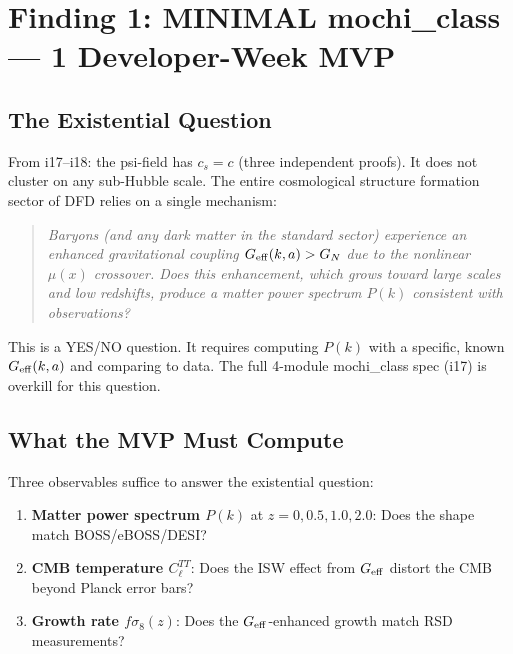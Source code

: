 \documentclass[11pt]{article}
\theoremstyle{definition}
\theoremstyle{remark}
\newcommand{\Geff}{G_{\rm eff}}
\begin{document}
\newpage
\tableofcontents
\newpage

\section{Finding 1: MINIMAL mochi\_class --- 1 Developer-Week MVP}
\label{sec:minimal}

\subsection{The Existential Question}

From i17--i18: the psi-field has $c_s = c$ (three independent proofs).
It does not cluster on any sub-Hubble scale. The entire cosmological
structure formation sector of DFD relies on a single mechanism:

\begin{quote}
\emph{Baryons (and any dark matter in the standard sector) experience
an enhanced gravitational coupling $\Geff(k,a) > G_N$ due to the
nonlinear $\mu(x)$ crossover. Does this enhancement, which grows
toward large scales and low redshifts, produce a matter power
spectrum $P(k)$ consistent with observations?}
\end{quote}

This is a YES/NO question. It requires computing $P(k)$ with a
specific, known $\Geff(k,a)$ and comparing to data. The full
4-module mochi\_class spec (i17) is overkill for this question.

\subsection{What the MVP Must Compute}

Three observables suffice to answer the existential question:

\begin{enumerate}
\item \textbf{Matter power spectrum $P(k)$} at $z = 0, 0.5, 1.0, 2.0$:
  Does the shape match BOSS/eBOSS/DESI?
\item \textbf{CMB temperature $C_\ell^{TT}$}:
  Does the ISW effect from $\Geff$ distort the CMB beyond Planck error bars?
\item \textbf{Growth rate $f\sigma_8(z)$}:
  Does the $\Geff$-enhanced growth match RSD measurements?
\end{enumerate}
\end{document}
